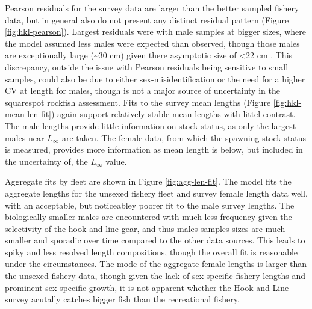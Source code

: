 \documentclass[11pt,
  english,
  a4paper,
]{article}
\begin{document}
Pearson residuals for the survey data are larger than the better sampled fishery data, but in general also do not present any distinct residual pattern (Figure \ref{fig:hkl-pearson}). Largest residuals were with male samples at bigger sizes, where the model assumed less males were expected than observed, though those males are exceptionally large (\textasciitilde30 cm) given there asymptotic size of \textless22 cm . This discrepancy, outside the issue with Pearson residuals being sensitive to small samples, could also be due to either sex-misidentification or the need for a higher CV at length for males, though is not a major source of uncertainty in the squarespot rockfish assessment. Fits to the survey mean lengths (Figure \ref{fig:hkl-mean-len-fit}) again support relatively stable mean lengths with littel contrast. The male lengths provide little information on stock status, as only the largest males near {\(L_{\infty}\)\leavevmode\tagmcend\tagstructend} are taken. The female data, from which the spawning stock status is measured, provides more information as mean length is below, but included in the uncertainty of, the {\(L_{\infty}\)\leavevmode\tagmcend\tagstructend} value.

\leavevmode\tagmcend\tagstructend\par


Aggregate fits by fleet are shown in Figure \ref{fig:agg-len-fit}. The model fits the aggregate lengths for the unsexed fishery fleet and survey female length data well, with an acceptable, but noticeabley poorer fit to the male survey lengths. The biologically smaller males are encountered with much less frequency given the selectivity of the hook and line gear, and thus males samples sizes are much smaller and sporadic over time compared to the other data sources. This leads to spiky and less resolved length compositions, though the overall fit is reasonable under the circumstances. The mode of the aggregate female lengths is larger than the unsexed fishery data, though given the lack of sex-specific fishery lengths and prominent sex-specific growth, it is not apparent whether the Hook-and-Line survey acutally catches bigger fish than the recreational fishery.

\leavevmode\tagmcend\tagstructend\par

\end{document}
